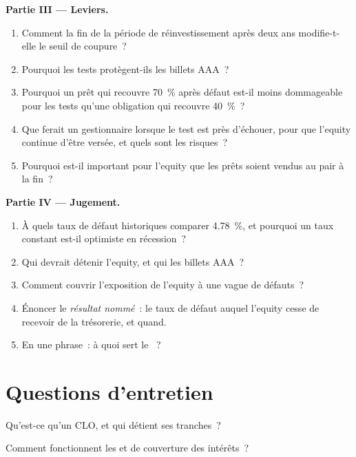 \begin{problem}
\medskip\noindent\textbf{Partie III --- Leviers.}
\begin{enumerate}[resume]
\item Comment la fin de la période de réinvestissement après deux ans modifie-t-elle le seuil de coupure~?
\item Pourquoi les tests protègent-ils les billets AAA~?
\item Pourquoi un prêt qui recouvre 70~\% après défaut est-il moins dommageable pour les tests
qu'une obligation qui recouvre 40~\%~?
\item Que ferait un gestionnaire lorsque le test est près d'échouer, pour que l'equity
continue d'être versée, et quels sont les risques~?
\item Pourquoi est-il important pour l'equity que les prêts soient vendus au pair à la fin~?
\end{enumerate}

\medskip\noindent\textbf{Partie IV --- Jugement.}
\begin{enumerate}[resume]
\item À quels taux de défaut historiques comparer 4.78~\%, et pourquoi un taux constant
est-il optimiste en récession~?
\item Qui devrait détenir l'equity, et qui les billets AAA~?
\item Comment couvrir l'exposition de l'equity à une vague de défauts~?
\item Énoncer le \emph{résultat nommé}~: le taux de défaut auquel l'equity cesse de recevoir de la trésorerie,
et quand.
\item En une phrase~: à quoi sert le ~?
\end{enumerate}
\end{problem}

\section{Questions d'entretien}

\begin{interviewq}\label{iq:m2:loans-clos-and-securitisation:1}
Qu'est-ce qu'un CLO, et qui détient ses tranches~?
\end{interviewq}

\begin{interviewq}\label{iq:m2:loans-clos-and-securitisation:2}
Comment fonctionnent les  et de couverture des intérêts~?
\end{interviewq}

